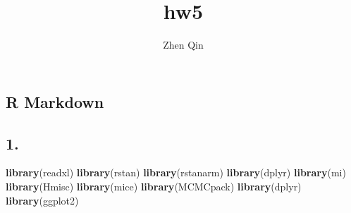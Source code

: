 \documentclass[]{article}
\title{hw5}
\author{Zhen Qin}
\date{}
\newenvironment{Shaded}{\begin{snugshade}}{\end{snugshade}}
\newcommand{\KeywordTok}[1]{\textcolor[rgb]{0.13,0.29,0.53}{\textbf{{#1}}}}
\newcommand{\NormalTok}[1]{{#1}}
\begin{document}
\maketitle

\subsection{R Markdown}\label{r-markdown}

\subsection{1.}\label{section}

\begin{Shaded}
\begin{Highlighting}[]
\KeywordTok{library}\NormalTok{(readxl)}
\KeywordTok{library}\NormalTok{(rstan)}
\KeywordTok{library}\NormalTok{(rstanarm)}
\KeywordTok{library}\NormalTok{(dplyr)}
\KeywordTok{library}\NormalTok{(mi)}
\KeywordTok{library}\NormalTok{(Hmisc)}
\KeywordTok{library}\NormalTok{(mice)}
\KeywordTok{library}\NormalTok{(MCMCpack)}
\KeywordTok{library}\NormalTok{(dplyr)}
\KeywordTok{library}\NormalTok{(ggplot2)}
\end{Highlighting}
\end{Shaded}
\end{document}
